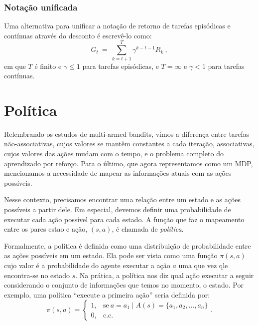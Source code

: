 \documentclass{article}
\begin{document}
            \subsubsection{Notação unificada}

                Uma alternativa para unificar a notação de retorno de tarefas episódicas e contínuas através do desconto é escrevê-lo como:
                \begin{equation}
                    G_t \ = \ \sum_{k=t+1}^{T} \gamma^{k-t-1} R_k\ ,
                \end{equation}
                em que $T$ é finito e $\gamma \leq 1$ para tarefas episódicas, e $T = \infty$ e $\gamma < 1$ para tarefas contínuas.
           
    \section{Política}
    
        Relembrando os estudos de multi-armed bandits, vimos a diferença entre tarefas não-associativas, cujos valores se mantêm constantes a cada iteração, associativas, cujos valores das ações mudam com o tempo, e o problema completo do aprendizado por reforço. Para o último, que agora representamos como um MDP, mencionamos a necessidade de mapear as informações atuais com as ações possíveis.

        Nesse contexto, precisamos encontrar uma relação entre um estado e as ações possíveis a partir dele. Em especial, devemos definir uma probabilidade de executar cada ação possível para cada estado. A função que faz o mapeamento entre os pares estao e ação, $(s, a)$, é chamada de \emph{política}. 
        
        Formalmente, a política é definida como uma distribuição de probabilidade entre as ações possíveis em um estado. Ela pode ser vista como uma função $\pi(s, a)$ cujo valor é a probabilidade do agente executar a ação $a$ uma que vez qle encontra-se no estado $s$. Na prática, a política nos diz qual ação executar a seguir considerando o conjunto de informações que temos no momento, o estado. Por exemplo, uma política ``execute a primeira ação'' seria definida por:
        \begin{equation}
            \pi(s, a) =
            \begin{cases}
                1, & \text{se}\ a = a_1 \mid A(s) = \{a_1, a_2, \dots, a_n\}\\
                0, & \text{c.c.}
            \end{cases}
            .
        \end{equation}
    
\end{document}
